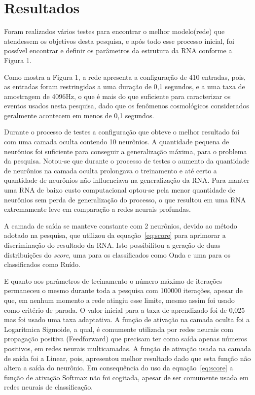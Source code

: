 \chapter{Resultados}

Foram realizados vários testes para encontrar o melhor modelo(rede) que atendessem os objetivos desta pesquisa, e após todo esse processo inicial, foi possível encontrar e definir os parâmetros da estrutura da RNA conforme a Figura 1.

Como mostra a Figura 1, a rede apresenta a configuração de 410 entradas, pois, as entradas foram restringidas a uma duração de 0,1 segundos, e a uma taxa de amostragem de 4096Hz, o que é mais do que suficiente para caracterizar os eventos usados nesta pesquisa, dado que os fenômenos cosmológicos considerados geralmente acontecem em menos de 0,1 segundos.

Durante o processo de testes a configuração que obteve o melhor resultado foi com uma camada oculta contendo 10 neurônios. A quantidade pequena de neurônios foi suficiente para conseguir a generalização máxima, para o problema da pesquisa. Notou-se que durante o processo de testes o aumento da quantidade de neurônios na camada oculta prolongava o treinamento e até certo a quantidade de neurônios não influenciava na generalização da RNA. Para manter uma RNA de baixo custo computacional optou-se pela menor quantidade de neurônios sem perda de generalização do processo, o que resultou em uma RNA extremamente leve em comparação a redes neurais profundas. 

A camada de saída se manteve constante com 2 neurônios, devido ao método adotado na pesquisa, que utilizou da equação~\ref{eq:score} para aprimorar a discriminação do resultado da RNA. Isto possibilitou a geração de duas distribuições do \textit{score}, uma para os classificados como Onda e uma para os classificados como Ruído.

E quanto aos parâmetros de treinamento o número máximo de iterações permaneceu o mesmo durante toda a pesquisa com 100000 iterações, apesar de que, em nenhum momento a rede atingiu esse limite, mesmo assim foi usado como critério de parada. O valor inicial para a taxa de aprendizado foi de 0,025 mas foi usado uma taxa adaptativa. A função de ativação na camada oculta foi a Logarítmica Sigmoide, a qual, é comumente utilizada por redes neurais com propagação positiva (Feedforward) que precisam ter como saída apenas números positivos, em redes neurais multicamadas. A função de ativação usada na camada de saída foi a Linear, pois, apresentou melhor resultado dado que esta função não altera a saída do neurônio. Em consequência do uso da equação~\ref{eq:score}  a função de ativação Softmax não foi cogitada, apesar de ser comumente usada em redes neurais de classificação.

